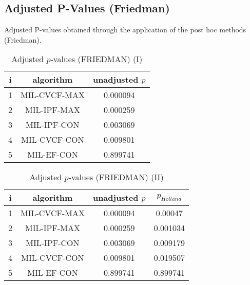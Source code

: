 \documentclass[a4paper,10pt]{article}
\begin{document}
\begin{landscape}
\newpage

\section{Adjusted P-Values (Friedman)}


Adjusted P-values obtained through the application of the post hoc methods (Friedman).

\begin{table}[!htp]
\centering\small
\begin{tabular}{ccc}
i&algorithm&unadjusted $p$\\
\hline1&MIL-CVCF-MAX&0.000094\\2&MIL-IPF-MAX&0.000259\\3&MIL-IPF-CON&0.003069\\4&MIL-CVCF-CON&0.009801\\5&MIL-EF-CON&0.899741\\\hline
\end{tabular}
\caption{Adjusted $p$-values (FRIEDMAN) (I)}
\end{table}
\begin{table}[!htp]
\centering\small
\begin{tabular}{cccc}
i&algorithm&unadjusted $p$&$p_{Holland}$\\
\hline1&MIL-CVCF-MAX&0.000094&0.00047\\2&MIL-IPF-MAX&0.000259&0.001034\\3&MIL-IPF-CON&0.003069&0.009179\\4&MIL-CVCF-CON&0.009801&0.019507\\5&MIL-EF-CON&0.899741&0.899741\\\hline
\end{tabular}
\caption{Adjusted $p$-values (FRIEDMAN) (II)}
\end{table}

\newpage
\end{landscape}
\end{document}
